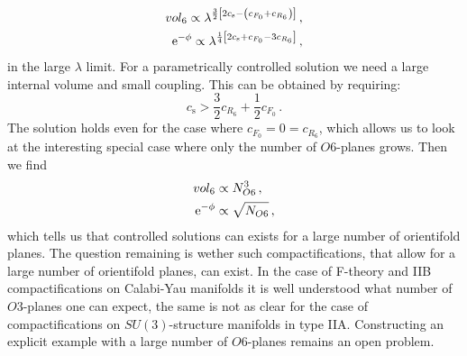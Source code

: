 \documentclass[12pt]{report}
\newcommand{\be}{\begin{equation}}
\newcommand{\ee}{\end{equation}}
\newcommand{\bea}{\begin{equation}\begin{aligned}}
\newcommand{\eea}{\end{aligned}\end{equation}}
\def\rme{{\rm e}}
\begin{document}
\bea 
vol_6 \propto \lambda^ {\frac{3}{2} \left[ 2 c_{\text{s}} - \left(c_{F_0} + c_{R_6}\right)\right]}\,,\\
\rme^ {-\phi} \propto \lambda^ {\frac{1}{4} \left[2c_{\text{s}}+c_{F_0} -3 c_{R_6}\right]}\,,
\eea
in the large $\lambda$ limit. For a parametrically controlled solution we need a large internal volume and small coupling. This can be obtained by requiring:
\be 
c_{\text{s}} > \frac{3}{2} c_{R_6} + \frac{1}{2} c_{F_0}\,.
\ee
The solution holds even for the case where $c_{F_0} = 0 = c_{R_6}$, which allows us to look at the interesting special case where only the number of $O6$-planes grows. Then we find 
\bea
vol_6 &\propto N^ 3_{O6}\,,\\
\rme^ {-\phi} &\propto \sqrt{N_{O6}}\,,
\eea
which tells us that controlled solutions can exists for a large number of orientifold planes. The question remaining is wether such compactifications, that allow for a large number of orientifold planes, can exist. In the case of F-theory and IIB compactifications on Calabi-Yau manifolds it is well understood what number of $O3$-planes one can expect, the same is not as clear for the case of compactifications on $SU(3)$-structure manifolds in type IIA. Constructing an explicit example with a large number of $O6$-planes remains an open problem.
\end{document}
